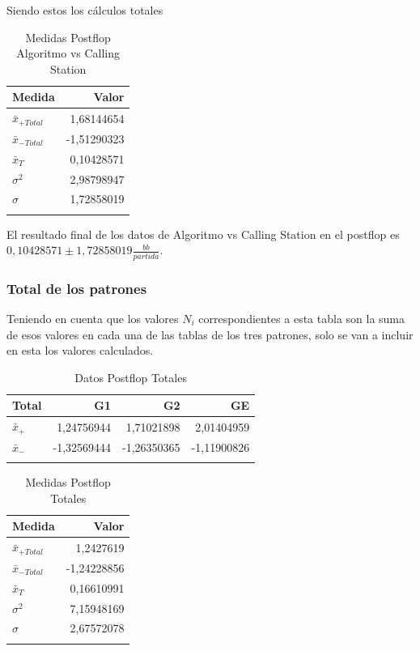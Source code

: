Siendo estos los cálculos totales

\begin{longtable}[c]{lr}
\hline 
Medida & Valor \\ \hline 
$\bar{x}_{+Total}$ & 1,68144654 \\
$\bar{x}_{-Total}$ & -1,51290323 \\
$\bar{x}_T$ & 0,10428571 \\
$\sigma^2$ & 2,98798947 \\
$\sigma$ &1,72858019 \\  \hline
\caption{Medidas Postflop Algoritmo vs Calling Station}
\label{tab:MPFAvC}
\end{longtable}


El resultado final de los datos de Algoritmo vs Calling Station en el postflop es  $0,10428571\pm 1,72858019 $$\frac{bb}{partida}$.

\vspace{5mm} %


\subsubsection{Total de los patrones}

Teniendo en cuenta que los valores $N_i$ correspondientes a esta tabla son la suma de esos valores en cada una de las tablas de los tres patrones, solo se van a incluir en esta los valores calculados.

\begin{longtable}[c]{lrrr}
\hline 
Total & G1 & G2 & GE \\ \hline
$\bar{x}_+$ & 1,24756944 & 1,71021898 & 2,01404959 \\
$\bar{x}_-$& -1,32569444 & -1,26350365 & -1,11900826 \\ \hline
\caption{Datos Postflop Totales}
\label{tab:DPFT}
\end{longtable}

\vspace{5mm} %

\begin{longtable}[c]{lr}
\hline 
Medida & Valor \\ \hline 
$\bar{x}_{+Total}$ & 1,2427619 \\
$\bar{x}_{-Total}$ & -1,24228856 \\
$\bar{x}_T$ &0,16610991 \\
$\sigma^2$ & 7,15948169 \\
$\sigma$ &2,67572078 \\  \hline
\caption{Medidas Postflop Totales}
\label{tab:MPFT}
\end{longtable}

